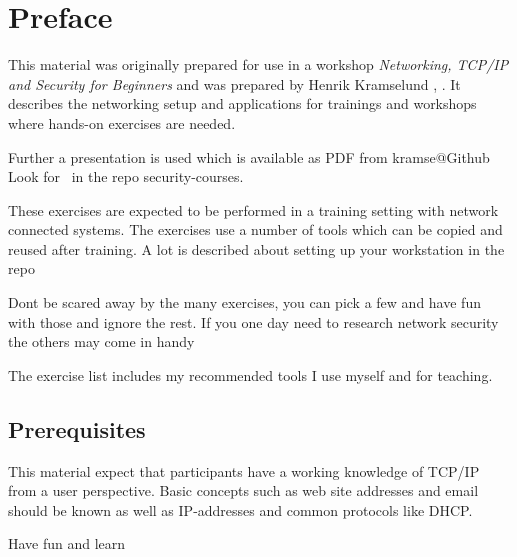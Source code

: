 \documentclass[a4paper,11pt,notitlepage]{report}
\begin{document}
\rm
{}
\newcommand{\subject}[1]{Networking, TCP/IP and Security for Beginners workshop}

\setcounter{tocdepth}{0}

{\color{titlecolor}
\renewcommand{\baselinestretch}{0.3}\setlength{\parskip}{1mm}
\tableofcontents}

\normal
\pagestyle{fancyplain}
\chapter*{\color{titlecolor}Preface}

This material was originally prepared for use in a workshop \emph{Networking, TCP/IP and Security for Beginners} and was prepared by
Henrik Kramselund  ,  .
It describes the networking setup and
applications for trainings and workshops where hands-on exercises are needed.

Further a presentation is used which is available as PDF from kramse@Github\\
Look for \jobname\ in the repo security-courses.

These exercises are expected to be performed in a training setting with network connected systems. The exercises use a number of tools which can be copied and reused after training. A lot is described about setting up your workstation in the repo


Dont be scared away by the many exercises, you can pick a few and have fun with those and ignore the rest. If you one day need to research network security the others may come in handy \smiley

The exercise list includes my recommended tools I use myself and for teaching.

\section*{\color{titlecolor}Prerequisites}

This material expect that participants have a working knowledge of
TCP/IP from a user perspective. Basic concepts such as web site addresses and email should be known as well as IP-addresses and common protocols like DHCP.


\vskip 1cm
Have fun and learn
\end{document}
